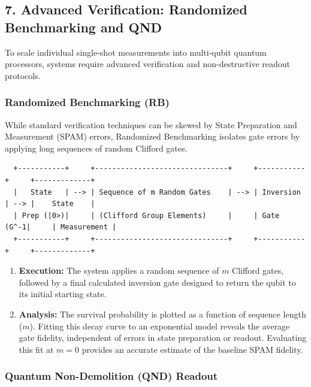 \documentclass[
]{article}
\providecommand{\tightlist}{%
  \setlength{\itemsep}{0pt}\setlength{\parskip}{0pt}}
\begin{document}
\subsection{7. Advanced Verification: Randomized Benchmarking and
QND}\label{advanced-verification-randomized-benchmarking-and-qnd}

To scale individual single-shot measurements into multi-qubit quantum
processors, systems require advanced verification and non-destructive
readout protocols.

\subsubsection{Randomized Benchmarking
(RB)}\label{randomized-benchmarking-rb}

While standard verification techniques can be skewed by State
Preparation and Measurement (SPAM) errors, Randomized Benchmarking
isolates gate errors by applying long sequences of random Clifford
gates.

\begin{verbatim}
  +-----------+     +-------------------------------+     +-----------+     +-------------+
  |   State   | --> | Sequence of m Random Gates    | --> | Inversion | --> |    State    |
  | Prep (|0>)|     | (Clifford Group Elements)     |     | Gate (G^-1|     | Measurement |
  +-----------+     +-------------------------------+     +-----------+     +-------------+
\end{verbatim}

\begin{enumerate}
\def\labelenumi{\arabic{enumi}.}
\tightlist
\item
  \textbf{Execution:} The system applies a random sequence of \(m\)
  Clifford gates, followed by a final calculated inversion gate designed
  to return the qubit to its initial starting state.
\item
  \textbf{Analysis:} The survival probability is plotted as a function
  of sequence length (\(m\)). Fitting this decay curve to an exponential
  model reveals the average gate fidelity, independent of errors in
  state preparation or readout. Evaluating this fit at \(m=0\) provides
  an accurate estimate of the baseline SPAM fidelity.
\end{enumerate}

\subsubsection{Quantum Non-Demolition (QND)
Readout}\label{quantum-non-demolition-qnd-readout}
\end{document}
